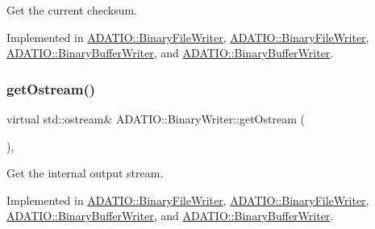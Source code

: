 Get the current checksum. 



Implemented in \mbox{\hyperlink{classADATIO_1_1BinaryFileWriter_ad6f9d995a02d4b3e8e12ad18972d58a5}{A\+D\+A\+T\+I\+O\+::\+Binary\+File\+Writer}}, \mbox{\hyperlink{classADATIO_1_1BinaryFileWriter_ad6f9d995a02d4b3e8e12ad18972d58a5}{A\+D\+A\+T\+I\+O\+::\+Binary\+File\+Writer}}, \mbox{\hyperlink{classADATIO_1_1BinaryBufferWriter_a3d7ec1583f03981f0a84571646be46f3}{A\+D\+A\+T\+I\+O\+::\+Binary\+Buffer\+Writer}}, and \mbox{\hyperlink{classADATIO_1_1BinaryBufferWriter_a3d7ec1583f03981f0a84571646be46f3}{A\+D\+A\+T\+I\+O\+::\+Binary\+Buffer\+Writer}}.

\mbox{\label{classADATIO_1_1BinaryWriter_a4fe227341d17d012bb83a070c208dac0}} 
\subsubsection{\texorpdfstring{getOstream()}{getOstream()}\hspace{0.1cm}{\footnotesize\ttfamily [1/2]}}
{\footnotesize\ttfamily virtual std\+::ostream\& A\+D\+A\+T\+I\+O\+::\+Binary\+Writer\+::get\+Ostream (\begin{DoxyParamCaption}{ }\end{DoxyParamCaption})\hspace{0.3cm}{\ttfamily [protected]}, {}}



Get the internal output stream. 



Implemented in \mbox{\hyperlink{classADATIO_1_1BinaryFileWriter_a2506200a774d4823088a0365e0452d9a}{A\+D\+A\+T\+I\+O\+::\+Binary\+File\+Writer}}, \mbox{\hyperlink{classADATIO_1_1BinaryFileWriter_a2506200a774d4823088a0365e0452d9a}{A\+D\+A\+T\+I\+O\+::\+Binary\+File\+Writer}}, \mbox{\hyperlink{classADATIO_1_1BinaryBufferWriter_a587ce48f0cf6dd4064edde6db836c0a3}{A\+D\+A\+T\+I\+O\+::\+Binary\+Buffer\+Writer}}, and \mbox{\hyperlink{classADATIO_1_1BinaryBufferWriter_a587ce48f0cf6dd4064edde6db836c0a3}{A\+D\+A\+T\+I\+O\+::\+Binary\+Buffer\+Writer}}.


